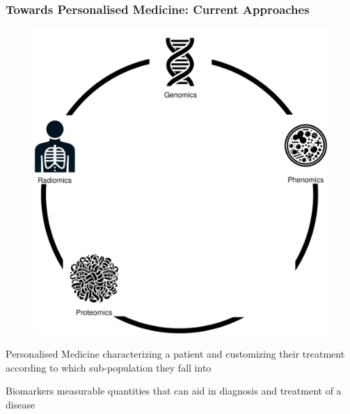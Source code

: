 \documentclass{beamer}
\begin{document}
\begin{frame}
	\frametitle{Towards Personalised Medicine: Current Approaches}
	\begin{minipage}{0.59\textwidth}
		\begin{figure}[H]
			\includegraphics[width=\textwidth]{images/approaches_current.eps}
		\end{figure}
	\end{minipage} 
	\begin{minipage}{0.39\textwidth}
	\begin{minipage}[t][0.41\paperheight][t]{\textwidth}
		\begin{block}{Personalised Medicine}
			characterizing a patient and customizing their treatment according to which sub-population they fall into	
		\end{block}
	\end{minipage}
	\begin{minipage}[t][0.41\paperheight][t]{\textwidth}
		\begin{block}{Biomarkers}
			measurable quantities that can aid in diagnosis and treatment of a disease
		\end{block}
	\end{minipage}
	\end{minipage}
\end{frame}
\end{document}
